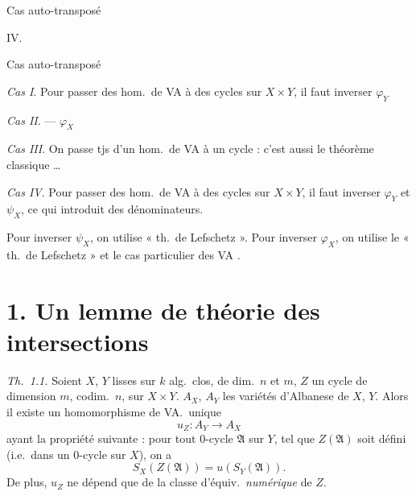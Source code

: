 \documentclass[11pt,a4paper]{article}
\begin{document}
Cas auto-transposé

IV.


Cas auto-transposé

\emph{Cas I}. Pour passer des hom.\ de VA à des cycles sur $X \times Y$, il faut inverser $\varphi_Y$

\emph{Cas II}.  — $\varphi_X$

\emph{Cas III}. On passe tjs \struck{\ill{}} d'un hom.\ de VA à un cycle : c'est aussi le théorème classique …

\emph{Cas IV}. Pour passer des hom.\ de VA à des cycles sur $X \times Y$, il faut inverser $\varphi_Y$ et $\psi_X$, ce qui introduit des dénominateurs.

Pour inverser $\psi_X$, on utilise « th.\ de Lefschetz ».
Pour inverser $\varphi_X$, on utilise le « th.\ de Lefschetz » et le cas particulier des VA .

\section*{1. Un lemme de théorie des intersections}


\emph{Th.\ 1.1.} Soient $X$, $Y$  lisses  sur $k$ alg.\ clos, de dim.\ $n$ et $m$, $Z$ un cycle de dimension $m$, codim.\ $n$, sur $X \times Y$. $A_X$, $A_Y$ les variétés d'Albanese  de $X$, $Y$. Alors il existe un homomorphisme de VA.\ unique
\[
  u_Z : A_Y \longrightarrow A_X
\]
ayant la propriété suivante : pour tout $0$-cycle $\mathfrak{A}$ sur $Y$,  tel que $Z(\mathfrak{A})$ soit défini (i.e.\ dans un $0$-cycle sur $X$), on a
\[
  S_X(Z(\mathfrak{A})) = u(S_Y(\mathfrak{A})) .
\]
De plus, $u_Z$ ne dépend que de la classe d'équiv.\ \emph{numérique} de $Z$.
\end{document}
